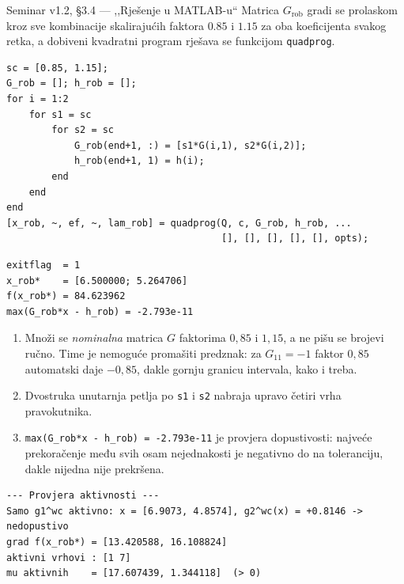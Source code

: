 \begin{seminar}{Seminar v1.2, §3.4 --- ,,Rješenje u MATLAB-u``}
Matrica $G_{\mathrm{rob}}$ gradi se prolaskom kroz sve kombinacije skalirajućih
faktora $0.85$ i $1.15$ za oba koeficijenta svakog retka, a dobiveni kvadratni
program rješava se funkcijom \texttt{quadprog}.

\begin{lstlisting}[style=matlabstyle]
sc = [0.85, 1.15];
G_rob = []; h_rob = [];
for i = 1:2
    for s1 = sc
        for s2 = sc
            G_rob(end+1, :) = [s1*G(i,1), s2*G(i,2)];
            h_rob(end+1, 1) = h(i);
        end
    end
end
[x_rob, ~, ef, ~, lam_rob] = quadprog(Q, c, G_rob, h_rob, ...
                                      [], [], [], [], [], opts);
\end{lstlisting}

\begin{lstlisting}[style=outputstyle]
exitflag  = 1
x_rob*    = [6.500000; 5.264706]
f(x_rob*) = 84.623962
max(G_rob*x - h_rob) = -2.793e-11
\end{lstlisting}
\end{seminar}

\begin{korak}
\begin{enumerate}[leftmargin=*]
  \item Množi se \emph{nominalna} matrica $G$ faktorima $0{,}85$ i $1{,}15$, a ne
        pišu se brojevi ručno. Time je nemoguće promašiti predznak: za
        $G_{11} = -1$ faktor $0{,}85$ automatski daje $-0{,}85$, dakle gornju
        granicu intervala, kako i treba.
  \item Dvostruka unutarnja petlja po \texttt{s1} i \texttt{s2} nabraja upravo
        četiri vrha pravokutnika.
  \item \texttt{max(G\_rob*x - h\_rob) = -2.793e-11} je provjera dopustivosti:
        najveće prekoračenje među svih osam nejednakosti je negativno do na
        toleranciju, dakle nijedna nije prekršena.
\end{enumerate}
\end{korak}

\begin{lstlisting}[style=outputstyle]
--- Provjera aktivnosti ---
Samo g1^wc aktivno: x = [6.9073, 4.8574], g2^wc(x) = +0.8146 -> nedopustivo
grad f(x_rob*) = [13.420588, 16.108824]
aktivni vrhovi : [1 7]
mu aktivnih    = [17.607439, 1.344118]  (> 0)
\end{lstlisting}
